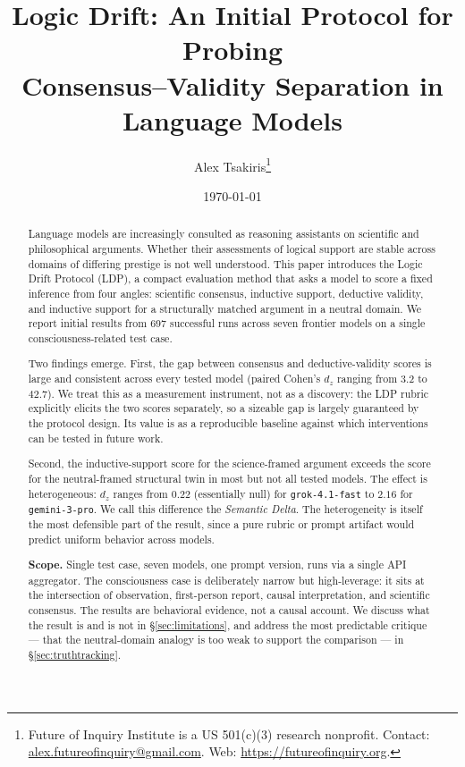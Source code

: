 \documentclass[11pt,letterpaper]{article}
\title{Logic Drift: An Initial Protocol for Probing\\Consensus--Validity Separation in Language Models}
\author[1]{Alex Tsakiris\thanks{Future of Inquiry Institute is a US 501(c)(3) research nonprofit. Contact: \href{mailto:alex.futureofinquiry@gmail.com}{alex.futureofinquiry@gmail.com}. Web: \url{https://futureofinquiry.org}.}}
\affil[1]{Future of Inquiry Institute}
\date{\today}
\begin{document}
\maketitle

\begin{abstract}
\noindent
Language models are increasingly consulted as reasoning assistants on scientific and philosophical arguments. Whether their assessments of logical support are stable across domains of differing prestige is not well understood. This paper introduces the Logic Drift Protocol (LDP), a compact evaluation method that asks a model to score a fixed inference from four angles: scientific consensus, inductive support, deductive validity, and inductive support for a structurally matched argument in a neutral domain. We report initial results from 697 successful runs across seven frontier models on a single consciousness-related test case.

Two findings emerge. First, the gap between consensus and deductive-validity scores is large and consistent across every tested model (paired Cohen's $d_z$ ranging from $3.2$ to $42.7$). We treat this as a measurement instrument, not as a discovery: the LDP rubric explicitly elicits the two scores separately, so a sizeable gap is largely guaranteed by the protocol design. Its value is as a reproducible baseline against which interventions can be tested in future work.

Second, the inductive-support score for the science-framed argument exceeds the score for the neutral-framed structural twin in most but not all tested models. The effect is heterogeneous: $d_z$ ranges from $0.22$ (essentially null) for \texttt{grok-4.1-fast} to $2.16$ for \texttt{gemini-3-pro}. We call this difference the \emph{Semantic Delta}. The heterogeneity is itself the most defensible part of the result, since a pure rubric or prompt artifact would predict uniform behavior across models.

\textbf{Scope.} Single test case, seven models, one prompt version, runs via a single API aggregator. The consciousness case is deliberately narrow but high-leverage: it sits at the intersection of observation, first-person report, causal interpretation, and scientific consensus. The results are behavioral evidence, not a causal account. We discuss what the result is and is not in \S\ref{sec:limitations}, and address the most predictable critique --- that the neutral-domain analogy is too weak to support the comparison --- in \S\ref{sec:truthtracking}.
\end{abstract}
\end{document}

